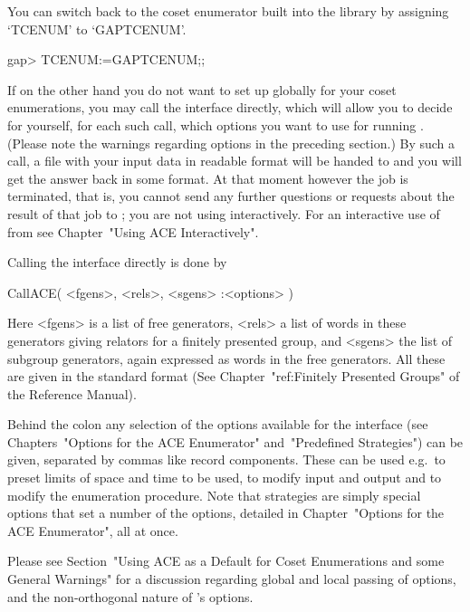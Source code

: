 You can switch back  to the  coset enumerator  built into  the {\GAP}
library by assigning `TCENUM' to `GAPTCENUM'.

\begintt
gap> TCENUM:=GAPTCENUM;;
\endtt


If on  the other hand you  do not want  to set up {\ACE}  globally for
your coset  enumerations, you may call the  {\ACE} interface directly,
which will allow you to decide for yourself, for each such call, which
options you  want to use for running {\ACE}. (Please note the warnings
regarding options in the preceding section.)  By such a call,  a  file
with  your input  data in  {\ACE} readable  format will  be  handed to
{\ACE} and you will get the answer back in some {\GAP} format. At that
moment however the {\ACE} job  is terminated, that is, you cannot send
any  further questions or  requests about  the result  of that  job to
{\ACE}; you  are not using  {\ACE} interactively.  For  an interactive
use of {\ACE} from {\GAP} see Chapter~"Using ACE Interactively".

Calling the {\ACE} interface directly is done by

\>CallACE( <fgens>, <rels>, <sgens> :<options> )

Here <fgens> is  a list of free generators, <rels> a  list of words in
these generators  giving relators for a finitely  presented group, and
<sgens> the list  of subgroup generators, again expressed  as words in
the free generators. All these are given in the standard {\GAP} format
(See Chapter~"ref:Finitely  Presented Groups" of  the {\GAP} Reference
Manual).

Behind  the colon  any  selection  of the  options  available for  the
interface   (see    Chapters~"Options   for   the    ACE   Enumerator"
and~"Predefined Strategies")  can be  given, separated by  commas like
record components.  These  can be used e.g.~to preset  limits of space
and time  to be  used, to modify  input and  output and to  modify the
enumeration procedure. Note that strategies are simply special options
that set a number of the options, detailed in Chapter~"Options for the
ACE Enumerator", all at once.

Please  see Section~"Using ACE as a Default for Coset Enumerations and 
some General Warnings" for a discussion  regarding  global  and  local
passing of options, and the non-orthogonal nature of {\ACE}'s options.

